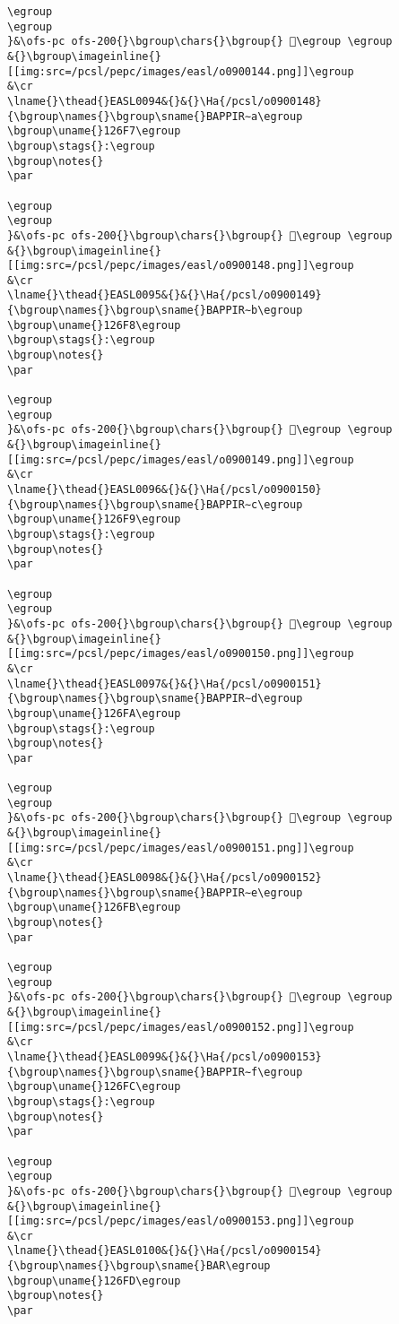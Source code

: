 \begin{verbatim}
\egroup
\egroup
}&\ofs-pc ofs-200{}\bgroup\chars{}\bgroup{} 𒛶\egroup \egroup
&{}\bgroup\imageinline{}[[img:src=/pcsl/pepc/images/easl/o0900144.png]]\egroup
&\cr
\lname{}\thead{}EASL0094&{}&{}\Ha{/pcsl/o0900148}{\bgroup\names{}\bgroup\sname{}BAPPIR∼a\egroup
\bgroup\uname{}126F7\egroup
\bgroup\stags{}:\egroup
\bgroup\notes{}
\par 

\egroup
\egroup
}&\ofs-pc ofs-200{}\bgroup\chars{}\bgroup{} 𒛷\egroup \egroup
&{}\bgroup\imageinline{}[[img:src=/pcsl/pepc/images/easl/o0900148.png]]\egroup
&\cr
\lname{}\thead{}EASL0095&{}&{}\Ha{/pcsl/o0900149}{\bgroup\names{}\bgroup\sname{}BAPPIR∼b\egroup
\bgroup\uname{}126F8\egroup
\bgroup\stags{}:\egroup
\bgroup\notes{}
\par 

\egroup
\egroup
}&\ofs-pc ofs-200{}\bgroup\chars{}\bgroup{} 𒛸\egroup \egroup
&{}\bgroup\imageinline{}[[img:src=/pcsl/pepc/images/easl/o0900149.png]]\egroup
&\cr
\lname{}\thead{}EASL0096&{}&{}\Ha{/pcsl/o0900150}{\bgroup\names{}\bgroup\sname{}BAPPIR∼c\egroup
\bgroup\uname{}126F9\egroup
\bgroup\stags{}:\egroup
\bgroup\notes{}
\par 

\egroup
\egroup
}&\ofs-pc ofs-200{}\bgroup\chars{}\bgroup{} 𒛹\egroup \egroup
&{}\bgroup\imageinline{}[[img:src=/pcsl/pepc/images/easl/o0900150.png]]\egroup
&\cr
\lname{}\thead{}EASL0097&{}&{}\Ha{/pcsl/o0900151}{\bgroup\names{}\bgroup\sname{}BAPPIR∼d\egroup
\bgroup\uname{}126FA\egroup
\bgroup\stags{}:\egroup
\bgroup\notes{}
\par 

\egroup
\egroup
}&\ofs-pc ofs-200{}\bgroup\chars{}\bgroup{} 𒛺\egroup \egroup
&{}\bgroup\imageinline{}[[img:src=/pcsl/pepc/images/easl/o0900151.png]]\egroup
&\cr
\lname{}\thead{}EASL0098&{}&{}\Ha{/pcsl/o0900152}{\bgroup\names{}\bgroup\sname{}BAPPIR∼e\egroup
\bgroup\uname{}126FB\egroup
\bgroup\notes{}
\par 

\egroup
\egroup
}&\ofs-pc ofs-200{}\bgroup\chars{}\bgroup{} 𒛻\egroup \egroup
&{}\bgroup\imageinline{}[[img:src=/pcsl/pepc/images/easl/o0900152.png]]\egroup
&\cr
\lname{}\thead{}EASL0099&{}&{}\Ha{/pcsl/o0900153}{\bgroup\names{}\bgroup\sname{}BAPPIR∼f\egroup
\bgroup\uname{}126FC\egroup
\bgroup\stags{}:\egroup
\bgroup\notes{}
\par 

\egroup
\egroup
}&\ofs-pc ofs-200{}\bgroup\chars{}\bgroup{} 𒛼\egroup \egroup
&{}\bgroup\imageinline{}[[img:src=/pcsl/pepc/images/easl/o0900153.png]]\egroup
&\cr
\lname{}\thead{}EASL0100&{}&{}\Ha{/pcsl/o0900154}{\bgroup\names{}\bgroup\sname{}BAR\egroup
\bgroup\uname{}126FD\egroup
\bgroup\notes{}
\par 


\end{verbatim}
